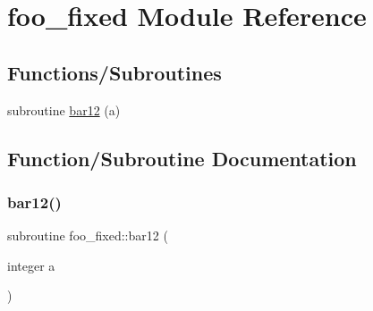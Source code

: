 \hypertarget{namespacefoo__fixed}{}\section{foo\+\_\+fixed Module Reference}
\label{namespacefoo__fixed}
\subsection*{Functions/\+Subroutines}
\begin{DoxyCompactItemize}
\item 
subroutine \hyperlink{namespacefoo__fixed_afa9b18960bf23d2ade846f9e12bfd07d}{bar12} (a)
\end{DoxyCompactItemize}


\subsection{Function/\+Subroutine Documentation}
\mbox{\label{namespacefoo__fixed_afa9b18960bf23d2ade846f9e12bfd07d}} 
\subsubsection{\texorpdfstring{bar12()}{bar12()}}
{\footnotesize\ttfamily subroutine foo\+\_\+fixed\+::bar12 (\begin{DoxyParamCaption}\item[{integer}]{a }\end{DoxyParamCaption})}


